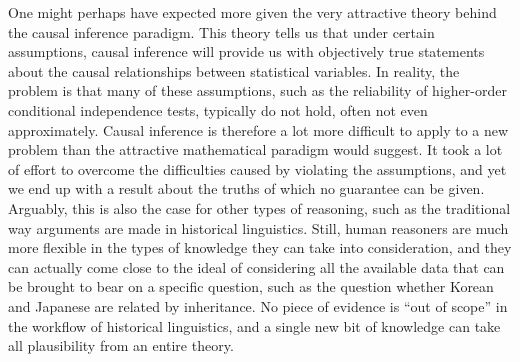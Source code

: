 One might perhaps have expected more given the very attractive theory behind the causal inference paradigm. This theory tells us that under certain assumptions, causal inference will provide us with objectively true statements about the causal relationships between statistical variables. In reality, the problem is that many of these assumptions, such as the reliability of higher-order conditional independence tests, typically do not hold, often not even approximately. Causal inference is therefore a lot more difficult to apply to a new problem than the attractive mathematical paradigm would suggest. It took a lot of effort to overcome the difficulties caused by violating the assumptions, and yet we end up with a result about the truths of which no guarantee can be given. Arguably, this is also the case for other types of reasoning, such as the traditional way arguments are made in historical linguistics. Still, human reasoners are much more flexible in the types of knowledge they can take into consideration, and they can actually come close to the ideal of considering all the available data that can be brought to bear on a specific question, such as the question whether Korean and Japanese are related by inheritance. No piece of evidence is ``out of scope'' in the workflow of historical linguistics, and a single new bit of knowledge can take all plausibility from an entire theory.

